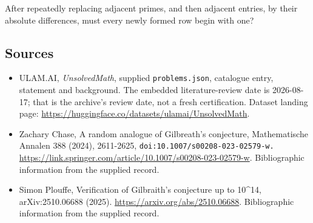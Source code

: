\documentclass[11pt,a4paper]{article}
\begin{document}
After repeatedly replacing adjacent primes, and then adjacent entries, by their absolute differences, must every newly formed row begin with one?

\subsection{Sources}

{\small

\begin{itemize}

\item[\hypertarget{source:statement:1}{S1}] ULAM.AI, \emph{UnsolvedMath}, supplied \texttt{problems.json}, catalogue entry, statement and background. The embedded literature-review date is 2026-08-17; that is the archive’s review date, not a fresh certification. Dataset landing page: \url{https://huggingface.co/datasets/ulamai/UnsolvedMath}.

\item[\hypertarget{source:statement:2}{S2}] Zachary Chase, A random analogue of Gilbreath's conjecture, Mathematische Annalen 388 (2024), 2611-2625, \nolinkurl{doi:10.1007/s00208-023-02579-w.} \url{https://link.springer.com/article/10.1007/s00208-023-02579-w}. Bibliographic information from the supplied record.

\item[\hypertarget{source:statement:3}{S3}] Simon Plouffe, Verification of Gilbraith's conjecture up to 10\textasciicircum{}14, arXiv:2510.06688 (2025). \url{https://arxiv.org/abs/2510.06688}. Bibliographic information from the supplied record.

\end{itemize}

}

\label{end:statement}
\end{document}
